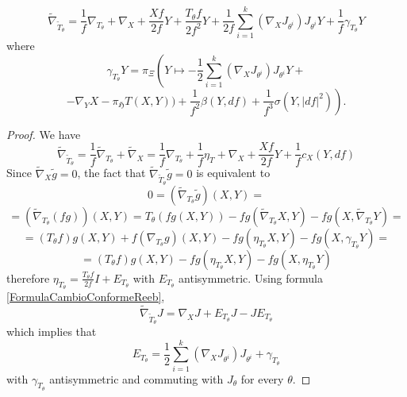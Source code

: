 \documentclass[10pt,a4paper]{amsart}
\newcommand{\g}[1]{\mathfrak{#1}}
\begin{document}
\begin{proposizione}
 $$\widetilde{\nabla}_{\widetilde{T}_{\theta}} =  \frac{1}{f}\nabla_{T_{\theta}} + \nabla_X + \frac{Xf}{2f}Y +\frac{T_{\theta}f}{2f^2}Y + \frac{1}{2f}\sum_{i=1}^k(\nabla_XJ_{\theta^i})J_{\theta^i}Y+ \frac{1}{f}\gamma_{T_{\theta}}Y $$
 where
 $$\gamma_{T_{\theta}}Y =\pi_{\Xi}\left(Y\mapsto -\frac{1}{2}\sum_{i=1}^k(\nabla_XJ_{\theta^i})J_{\theta^i}Y+\right.$$
 $$\left. - \nabla_YX - \pi_{\g{H}}T(X,Y)) +\frac{1}{f^2}\beta(Y,df) +\frac{1}{f^3}\sigma(Y,|df|^2) \right).$$
\end{proposizione}

\begin{proof}
 We have
 \begin{equation}\label{FormulaCambioConformeReeb}
  \widetilde{\nabla}_{\widetilde{T}_{\theta}} = \frac{1}{f}\widetilde{\nabla}_{T_{\theta}} + \widetilde{\nabla}_{X} = \frac{1}{f}\nabla_{T_{\theta}} + \frac{1}{f}\eta_T + \nabla_X + \frac{Xf}{2f}Y + \frac{1}{f}c_X(Y,df)
 \end{equation}
 Since $\widetilde{\nabla}_{X}\widetilde{g}=0$, the fact that $\widetilde{\nabla}_{\widetilde{T}_{\theta}}\widetilde{g}=0$ is equivalent to
 $$0= (\widetilde{\nabla}_{T_{\theta}}\widetilde{g})(X,Y) =$$
 $$= (\widetilde{\nabla}_{T_{\theta}}(fg))(X,Y) = T_{\theta}(fg(X,Y)) - fg(\widetilde{\nabla}_{T_{\theta}}X,Y) - fg(X,\widetilde{\nabla}_{T_{\theta}}Y) = $$
 $$ =   (T_{\theta}f)g(X,Y)  + f(\nabla_{T_{\theta}}g)(X,Y) - fg(\eta_{T_{\theta}}X,Y) - fg(X,\gamma_{T_{\theta}}Y) = $$
 $$ =   (T_{\theta}f)g(X,Y) - fg(\eta_{T_{\theta}}X,Y) - fg(X,\eta_{T_{\theta}}Y) $$
 therefore $\eta_{T_{\theta}} = \frac{T_{\theta}f}{2f}I + E_{T_{\theta}}$ with $E_{T_{\theta}}$ antisymmetric.
 Using formula \eqref{FormulaCambioConformeReeb},
 $$\widetilde{\nabla}_{\widetilde{T}_{\theta}}J = \nabla_XJ + E_{T_{\theta}}J - JE_{T_{\theta}}$$
 which implies that
 $$E_{T_{\theta}} = \frac{1}{2}\sum_{i=1}^k(\nabla_XJ_{\theta^i})J_{\theta^i}+\gamma_{T_{\theta}}$$
 with $\gamma_{T_{\theta}}$ antisymmetric and commuting with $J_{\theta}$ for every $\theta$.
 

\end{proof}
\end{document}
